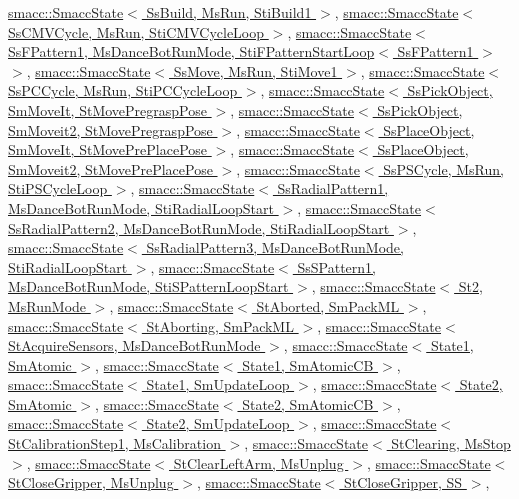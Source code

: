 \hyperlink{classsmacc_1_1SmaccState}{smacc\+::\+Smacc\+State$<$ Ss\+Build, Ms\+Run, Sti\+Build1 $>$}, \hyperlink{classsmacc_1_1SmaccState}{smacc\+::\+Smacc\+State$<$ Ss\+C\+M\+V\+Cycle, Ms\+Run, Sti\+C\+M\+V\+Cycle\+Loop $>$}, \hyperlink{classsmacc_1_1SmaccState}{smacc\+::\+Smacc\+State$<$ Ss\+F\+Pattern1, Ms\+Dance\+Bot\+Run\+Mode, Sti\+F\+Pattern\+Start\+Loop$<$ Ss\+F\+Pattern1 $>$ $>$}, \hyperlink{classsmacc_1_1SmaccState}{smacc\+::\+Smacc\+State$<$ Ss\+Move, Ms\+Run, Sti\+Move1 $>$}, \hyperlink{classsmacc_1_1SmaccState}{smacc\+::\+Smacc\+State$<$ Ss\+P\+C\+Cycle, Ms\+Run, Sti\+P\+C\+Cycle\+Loop $>$}, \hyperlink{classsmacc_1_1SmaccState}{smacc\+::\+Smacc\+State$<$ Ss\+Pick\+Object, Sm\+Move\+It, St\+Move\+Pregrasp\+Pose $>$}, \hyperlink{classsmacc_1_1SmaccState}{smacc\+::\+Smacc\+State$<$ Ss\+Pick\+Object, Sm\+Moveit2, St\+Move\+Pregrasp\+Pose $>$}, \hyperlink{classsmacc_1_1SmaccState}{smacc\+::\+Smacc\+State$<$ Ss\+Place\+Object, Sm\+Move\+It, St\+Move\+Pre\+Place\+Pose $>$}, \hyperlink{classsmacc_1_1SmaccState}{smacc\+::\+Smacc\+State$<$ Ss\+Place\+Object, Sm\+Moveit2, St\+Move\+Pre\+Place\+Pose $>$}, \hyperlink{classsmacc_1_1SmaccState}{smacc\+::\+Smacc\+State$<$ Ss\+P\+S\+Cycle, Ms\+Run, Sti\+P\+S\+Cycle\+Loop $>$}, \hyperlink{classsmacc_1_1SmaccState}{smacc\+::\+Smacc\+State$<$ Ss\+Radial\+Pattern1, Ms\+Dance\+Bot\+Run\+Mode, Sti\+Radial\+Loop\+Start $>$}, \hyperlink{classsmacc_1_1SmaccState}{smacc\+::\+Smacc\+State$<$ Ss\+Radial\+Pattern2, Ms\+Dance\+Bot\+Run\+Mode, Sti\+Radial\+Loop\+Start $>$}, \hyperlink{classsmacc_1_1SmaccState}{smacc\+::\+Smacc\+State$<$ Ss\+Radial\+Pattern3, Ms\+Dance\+Bot\+Run\+Mode, Sti\+Radial\+Loop\+Start $>$}, \hyperlink{classsmacc_1_1SmaccState}{smacc\+::\+Smacc\+State$<$ Ss\+S\+Pattern1, Ms\+Dance\+Bot\+Run\+Mode, Sti\+S\+Pattern\+Loop\+Start $>$}, \hyperlink{classsmacc_1_1SmaccState}{smacc\+::\+Smacc\+State$<$ St2, Ms\+Run\+Mode $>$}, \hyperlink{classsmacc_1_1SmaccState}{smacc\+::\+Smacc\+State$<$ St\+Aborted, Sm\+Pack\+M\+L $>$}, \hyperlink{classsmacc_1_1SmaccState}{smacc\+::\+Smacc\+State$<$ St\+Aborting, Sm\+Pack\+M\+L $>$}, \hyperlink{classsmacc_1_1SmaccState}{smacc\+::\+Smacc\+State$<$ St\+Acquire\+Sensors, Ms\+Dance\+Bot\+Run\+Mode $>$}, \hyperlink{classsmacc_1_1SmaccState}{smacc\+::\+Smacc\+State$<$ State1, Sm\+Atomic $>$}, \hyperlink{classsmacc_1_1SmaccState}{smacc\+::\+Smacc\+State$<$ State1, Sm\+Atomic\+C\+B $>$}, \hyperlink{classsmacc_1_1SmaccState}{smacc\+::\+Smacc\+State$<$ State1, Sm\+Update\+Loop $>$}, \hyperlink{classsmacc_1_1SmaccState}{smacc\+::\+Smacc\+State$<$ State2, Sm\+Atomic $>$}, \hyperlink{classsmacc_1_1SmaccState}{smacc\+::\+Smacc\+State$<$ State2, Sm\+Atomic\+C\+B $>$}, \hyperlink{classsmacc_1_1SmaccState}{smacc\+::\+Smacc\+State$<$ State2, Sm\+Update\+Loop $>$}, \hyperlink{classsmacc_1_1SmaccState}{smacc\+::\+Smacc\+State$<$ St\+Calibration\+Step1, Ms\+Calibration $>$}, \hyperlink{classsmacc_1_1SmaccState}{smacc\+::\+Smacc\+State$<$ St\+Clearing, Ms\+Stop $>$}, \hyperlink{classsmacc_1_1SmaccState}{smacc\+::\+Smacc\+State$<$ St\+Clear\+Left\+Arm, Ms\+Unplug $>$}, \hyperlink{classsmacc_1_1SmaccState}{smacc\+::\+Smacc\+State$<$ St\+Close\+Gripper, Ms\+Unplug $>$}, \hyperlink{classsmacc_1_1SmaccState}{smacc\+::\+Smacc\+State$<$ St\+Close\+Gripper, S\+S $>$}, 
